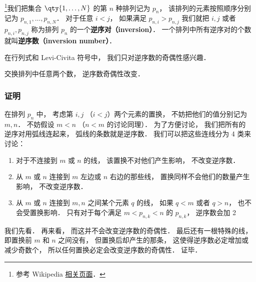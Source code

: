 
\begin{issues}
\issueDraft
\end{issues}


\footnote{参考 Wikipedia \href{https://en.wikipedia.org/wiki/Inversion_(discrete_mathematics)}{相关页面}．}我们把集合 $\qty{1,\dots,N}$ 的第 $n$ 种排列记为 $p_n$， 该排列的元素按照顺序分别记为 $p_{n,1}, \dots, p_{n,N}$． 对于任意 $i < j$， 如果满足 $p_{n,i} > p_{n,j}$ 我们就把 $i, j$ 或者 $p_{n,i}, p_{n,j}$ 称为排列 $p_n$ 的一个\textbf{逆序对（inversion）}． 一个排列中所有逆序对的个数就叫\textbf{逆序数（inversion number）}．

在行列式和 Levi-Civita 符号中， 我们只对逆序数的奇偶性感兴趣． 

\begin{theorem}{}
交换排列中任意两个数， 逆序数奇偶性改变． 
\end{theorem}

\subsubsection{证明}
在排列 $p_n$ 中， 考虑第 $i, j$ （$i < j$）两个元素的置换， 不妨把他们的值分别记为 $m, n$． 不妨假设 $m < n$ （$n < m$ 的讨论同理）． 为了方便讨论， 我们把所有的逆序对用弧线连起来， 弧线的条数就是逆序数． 我们可以把这些连线分为 4 类来讨论：
\begin{enumerate}
\item 对于不连接到 $m$ 或 $n$ 的线， 该置换不对他们产生影响， 不改变逆序数．
\item 从 $m$ 或 $n$ 连接到 $m$ 左边或 $n$ 右边的那些线， 置换同样不会他们的数量产生影响， 不改变逆序数．
\item 从 $m$ 或 $n$ 连接到 $m, n$ 之间某个元素 $q$ 的线， 如果 $q < m$ 或者 $q > n$， 也不会受置换影响． 只有对于每个满足 $m < p_{n,k} < n$ 的 $p_{n,k}$， 逆序数会加 2
\end{enumerate}

我们先看． 再来看， 而这并不会改变逆序数的奇偶性． 最后还有一根特殊的线， 即置换前 $m$ 和 $n$ 之间没有， 但置换后却产生的那条， 这使得逆序数必定增加或减少奇数个， 所以任何置换必定会改变逆序数的奇偶性． 证毕．
